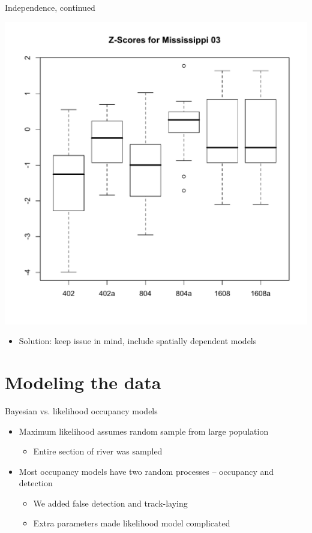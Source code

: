 \documentclass{beamer}
\begin{document}
\begin{frame}{Independence, continued}
	\begin{center}
		\includegraphics[scale=0.4]{independenceBoxplots.pdf}
	\end{center}
	\begin{itemize}
		\item Solution: keep issue in mind, include spatially dependent models
	\end{itemize}
\end{frame}

\section{Modeling the data}

\begin{frame}{Bayesian vs. likelihood occupancy models}
	\begin{itemize}
		\item Maximum likelihood assumes random sample from large population
		\begin{itemize}
			\item Entire section of river was sampled
		\end{itemize}
		\item Most occupancy models have two random processes -- occupancy and
		detection
		\begin{itemize}
			\item We added false detection and track-laying
			\item Extra parameters made likelihood model complicated
		\end{itemize}
	\end{itemize}
\end{frame}
\end{document}
